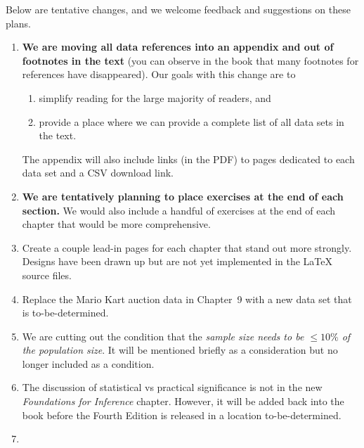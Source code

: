 \noindent%
Below are tentative changes, and we welcome
feedback and suggestions on these plans.
\begin{enumerate}
\item
    \textbf{We are moving all data references into an
    appendix and out of footnotes in the text}
    (you can observe in the book that many footnotes
    for references have disappeared).
    Our goals with this change are to
    \begin{enumerate}
    \item
        simplify reading for the large majority of readers, and
    \item
        provide a place where we can provide a complete
        list of all data sets in the text.
    \end{enumerate}
    The appendix will also include links (in the PDF)
    to pages dedicated to each data set
    and a CSV download link.
\item
    \textbf{We are tentatively planning to place exercises
    at the end of each section.}
    We would also include a handful of exercises at the
    end of each chapter that would be more comprehensive.
\item
    Create a couple lead-in pages for each chapter that
    stand out more strongly.
    Designs have been drawn up but are not yet implemented
    in the \LaTeX{} source files.
\item
    Replace the Mario Kart auction data in
    Chapter~9 with a new data set that is to-be-determined.
\item
    We are cutting out the condition that the
    \emph{sample size needs to be $\leq 10\%$ of the
    population size}.
    It will be mentioned briefly as a consideration
    but no longer included as a condition.
\item
    The discussion of statistical vs practical significance
    is not in the new \emph{Foundations for Inference} chapter.
    However, it will be added back into the book before the
    Fourth Edition is released in a location to-be-determined.
\item

\end{enumerate}
